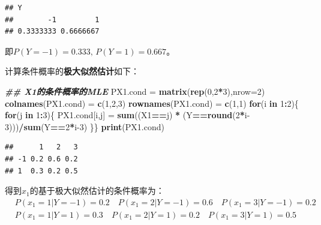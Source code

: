 \documentclass[
]{ctexart}
\newenvironment{Shaded}{\begin{snugshade}}{\end{snugshade}}
\newcommand{\AttributeTok}[1]{\textcolor[rgb]{0.13,0.29,0.53}{#1}}
\newcommand{\ControlFlowTok}[1]{\textcolor[rgb]{0.13,0.29,0.53}{\textbf{#1}}}
\newcommand{\DecValTok}[1]{\textcolor[rgb]{0.00,0.00,0.81}{#1}}
\newcommand{\DocumentationTok}[1]{\textcolor[rgb]{0.56,0.35,0.01}{\textbf{\textit{#1}}}}
\newcommand{\FunctionTok}[1]{\textcolor[rgb]{0.13,0.29,0.53}{\textbf{#1}}}
\newcommand{\NormalTok}[1]{#1}
\newcommand{\OtherTok}[1]{\textcolor[rgb]{0.56,0.35,0.01}{#1}}
\newcommand{\SpecialCharTok}[1]{\textcolor[rgb]{0.81,0.36,0.00}{\textbf{#1}}}
\newcommand{\StringTok}[1]{\textcolor[rgb]{0.31,0.60,0.02}{#1}}
\begin{document}
\begin{verbatim}
## Y
##        -1         1 
## 0.3333333 0.6666667
\end{verbatim}

即\(P(Y=-1)=0.333,\, P(Y=1)=0.667\)。

计算条件概率的\textbf{极大似然估计}如下：

\begin{Shaded}
\begin{Highlighting}[]
\DocumentationTok{\#\# X1的条件概率的MLE}
\NormalTok{PX1.cond }\OtherTok{=} \FunctionTok{matrix}\NormalTok{(}\FunctionTok{rep}\NormalTok{(}\DecValTok{0}\NormalTok{,}\DecValTok{2}\SpecialCharTok{*}\DecValTok{3}\NormalTok{),}\AttributeTok{nrow=}\DecValTok{2}\NormalTok{)}
\FunctionTok{colnames}\NormalTok{(PX1.cond) }\OtherTok{=} \FunctionTok{c}\NormalTok{(}\StringTok{\textquotesingle{}1\textquotesingle{}}\NormalTok{,}\StringTok{\textquotesingle{}2\textquotesingle{}}\NormalTok{,}\StringTok{\textquotesingle{}3\textquotesingle{}}\NormalTok{)}
\FunctionTok{rownames}\NormalTok{(PX1.cond) }\OtherTok{=} \FunctionTok{c}\NormalTok{(}\StringTok{\textquotesingle{}{-}1\textquotesingle{}}\NormalTok{,}\StringTok{\textquotesingle{}1\textquotesingle{}}\NormalTok{)}
\ControlFlowTok{for}\NormalTok{(i }\ControlFlowTok{in} \DecValTok{1}\SpecialCharTok{:}\DecValTok{2}\NormalTok{)\{}
  \ControlFlowTok{for}\NormalTok{(j }\ControlFlowTok{in} \DecValTok{1}\SpecialCharTok{:}\DecValTok{3}\NormalTok{)\{}
\NormalTok{  PX1.cond[i,j] }\OtherTok{=} \FunctionTok{sum}\NormalTok{((X1}\SpecialCharTok{==}\NormalTok{j) }\SpecialCharTok{*}\NormalTok{ (Y}\SpecialCharTok{==}\FunctionTok{round}\NormalTok{(}\DecValTok{2}\SpecialCharTok{*}\NormalTok{i}\DecValTok{{-}3}\NormalTok{)))}\SpecialCharTok{/}\FunctionTok{sum}\NormalTok{(Y}\SpecialCharTok{==}\DecValTok{2}\SpecialCharTok{*}\NormalTok{i}\DecValTok{{-}3}\NormalTok{)}
\NormalTok{  \}\}}
\FunctionTok{print}\NormalTok{(PX1.cond)}
\end{Highlighting}
\end{Shaded}

\begin{verbatim}
##      1   2   3
## -1 0.2 0.6 0.2
## 1  0.3 0.2 0.5
\end{verbatim}

得到\(x_1\)的基于极大似然估计的条件概率为： \begin{align*}
& P(x_1 = 1|Y=-1) = 0.2 \quad P(x_1 = 2|Y=-1) = 0.6 \quad P(x_1 = 3|Y=-1) = 0.2 \\
& P(x_1 = 1|Y=1) = 0.3 \quad P(x_1 = 2|Y=1) = 0.2 \quad P(x_1 = 3|Y=1) = 0.5 
\end{align*}
\end{document}
